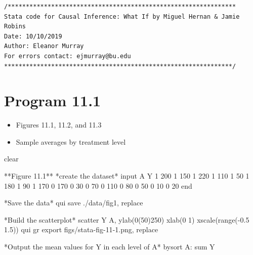 \documentclass[
  10pt,
  a4paper,
]{book}
\newenvironment{Shaded}{\begin{snugshade}}{\end{snugshade}}
\newcommand{\BaseNTok}[1]{\textcolor[rgb]{0.68,0.00,0.00}{#1}}
\newcommand{\DecValTok}[1]{\textcolor[rgb]{0.68,0.00,0.00}{#1}}
\newcommand{\KeywordTok}[1]{\textcolor[rgb]{0.00,0.46,0.62}{#1}}
\newcommand{\NormalTok}[1]{\textcolor[rgb]{0.00,0.46,0.62}{#1}}
\providecommand{\tightlist}{%
  \setlength{\itemsep}{0pt}\setlength{\parskip}{0pt}}
\begin{document}
\begin{verbatim}
/***************************************************************
Stata code for Causal Inference: What If by Miguel Hernan & Jamie Robins
Date: 10/10/2019
Author: Eleanor Murray 
For errors contact: ejmurray@bu.edu
***************************************************************/
\end{verbatim}

\hypertarget{program-11.1-1}{%
\section{Program 11.1}\label{program-11.1-1}}

\begin{itemize}
\tightlist
\item
  Figures 11.1, 11.2, and 11.3
\item
  Sample averages by treatment level
\end{itemize}

\begin{Shaded}
\begin{Highlighting}[]
\KeywordTok{clear}

\NormalTok{**Figure 11.1**}
\NormalTok{*create the dataset*}
\NormalTok{input A Y}
\NormalTok{1 200}
\NormalTok{1 150}
\NormalTok{1 220}
\NormalTok{1 110}
\NormalTok{1 50}
\NormalTok{1 180}
\NormalTok{1 90}
\NormalTok{1 170}
\NormalTok{0 170}
\NormalTok{0 30}
\NormalTok{0 70}
\NormalTok{0 110}
\NormalTok{0 80}
\NormalTok{0 50}
\NormalTok{0 10}
\NormalTok{0 20}
\KeywordTok{end}

\NormalTok{*Save the }\KeywordTok{data}\NormalTok{*}
\KeywordTok{qui} \KeywordTok{save}\NormalTok{ ./}\KeywordTok{data}\NormalTok{/fig1, }\KeywordTok{replace}

\NormalTok{*Build the scatterplot*}
\KeywordTok{scatter}\NormalTok{ Y A, ylab(0(50)250) xlab(0 1) }\BaseNTok{xscale}\NormalTok{(}\KeywordTok{range}\NormalTok{({-}0.5 1.5))}
\KeywordTok{qui} \KeywordTok{gr} \KeywordTok{export}\NormalTok{ figs/stata{-}fig{-}11{-}1.png, }\KeywordTok{replace}

\NormalTok{*Output the }\KeywordTok{mean} \KeywordTok{values} \KeywordTok{for}\NormalTok{ Y }\KeywordTok{in}\NormalTok{ each }\DecValTok{level} \KeywordTok{of}\NormalTok{ A*}
\KeywordTok{bysort}\NormalTok{ A: }\KeywordTok{sum}\NormalTok{ Y}
\end{Highlighting}
\end{Shaded}
\end{document}

